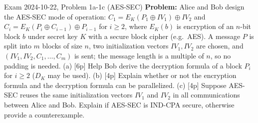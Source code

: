 \documentclass[12pt, a4paper]{article}
\begin{document}
\begin{practicebox}{Exam 2024-10-22, Problem 1a-1c (AES-SEC)}
\textbf{Problem:} Alice and Bob design the AES-SEC mode of operation: $C_1 = E_K(P_1 \oplus IV_1) \oplus IV_2$ and $C_i = E_K(P_i \oplus C_{i-1}) \oplus P_{i-1}$ for $i \geq 2$, where $E_K(b)$ is encryption of an $n$-bit block $b$ under secret key $K$ with a secure block cipher (e.g.\ AES). A message $P$ is split into $m$ blocks of size $n$, two initialization vectors $IV_1, IV_2$ are chosen, and $(IV_1, IV_2, C_1, \dots, C_m)$ is sent; the message length is a multiple of $n$, so no padding is needed. (a) [6p] Help Bob derive the decryption formula of a block $P_i$ for $i \geq 2$ ($D_K$ may be used). (b) [4p] Explain whether or not the encryption formula and the decryption formula can be parallelized. (c) [4p] Suppose AES-SEC reuses the same initialization vectors $IV_1$ and $IV_2$ in all communications between Alice and Bob. Explain if AES-SEC is IND-CPA secure, otherwise provide a counterexample.


\end{practicebox}
\end{document}
